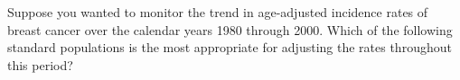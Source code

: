 Suppose you wanted to monitor the trend in age-adjusted incidence rates of breast cancer over the calendar years 1980 through 2000.  Which of the following standard populations is the most appropriate for adjusting the rates throughout this period?
\begin{MultipleChoice}[itemname=II-9]
\end{MultipleChoice}

